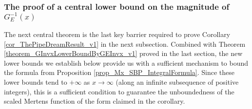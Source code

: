 \documentclass[11pt,reqno,a4letter]{article}
\numberwithin{figure}{section}
\numberwithin{table}{section}
\theoremstyle{plain}
\numberwithin{theorem}{section}
\theoremstyle{definition}
\begin{document}
\subsubsection{The proof of a central lower bound on the magnitude of $G_{E}^{-1}(x)$} 

The next central theorem is the last key barrier required to prove 
Corollary \ref{cor_ThePipeDreamResult_v1} 
in the next subsection. 
Combined with Theorem \ref{theorem_GInvxLowerBoundByGEInvx_v1} 
proved in the last section, the new lower bounds we establish below provide us 
with a sufficient mechanism to bound the formula from 
Proposition \ref{prop_Mx_SBP_IntegralFormula}. 
Since these lower bounds tend to $+\infty$ as $x \rightarrow \infty$ (along an 
infinite subsequence of positive integers), this is a sufficient condition to 
guarantee the unboundedness of the scaled Mertens function of the form 
claimed in the corollary. 
\end{document}
